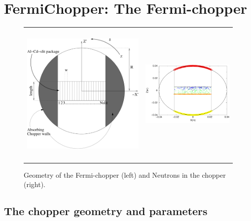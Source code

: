 \section{FermiChopper: The Fermi-chopper}


\begin{figure}
\begin{center}
\begin{tabular}{cc}
\includegraphics[height=7cm]{./figures/FCChoppergeo}
&
\includegraphics[height=5cm,width=5.3cm]{./figures/FCOverview}
\end{tabular}
\end{center}
\caption{Geometry of the Fermi-chopper (left) and Neutrons in the chopper (right).}
\label{fig:Overview}
\end{figure}

\subsection{The chopper geometry and parameters}
\label{ssec:chopper}


